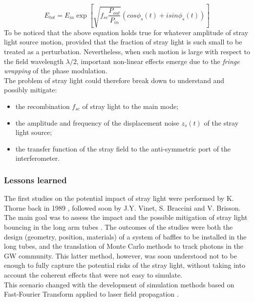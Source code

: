   \begin{equation}
        E_{tot} = E_{in} \exp \left[ \sqrt{f_{sc} \frac{P_{out}}{P_{in}}} \left( cos \phi_s(t) + i sin \phi_s(t) \right) \right]
  \end{equation}
  To be noticed that the above equation holds true for whatever amplitude of stray light source motion, provided that the fraction of stray light is such small to be treated as a perturbation. Nevertheless, when such motion is large with respect to the field wavelength $\lambda/2$, important non-linear effects emerge due to the \textit{fringe wrapping} of the phase modulation.\\
The problem of stray light could therefore break down to understand and possibly mitigate:
\begin{itemize}
    \item the recombination $ f_{sc}$ of stray light to the main mode;
    \item the amplitude and frequency of the displacement noise $z_s(t)$ of the stray light source;
    \item the transfer function of the stray field to the anti-symmetric port of the interferometer.
\end{itemize}
\subsubsection*{Lessons learned}
The first studies on the potential impact of stray light were performed by K. Thorne back in 1989 \cite{Thorne89}, followed soon by J.Y. Vinet, S. Braccini and V. Brisson. The main goal was to assess the impact and the possible mitigation of stray light bouncing in the long arm tubes \cite{Vinet96, Vinet97}. The outcomes of the studies were both the design (geometry, position, materials) of a system of baffles to be installed in the long tubes, and the translation of Monte Carlo methods to track photons in the GW community. This latter method, however, was soon understood not to be enough to fully capture the potential risks of the stray light, without taking into account the coherent effects that were not easy to simulate.\\ This scenario changed with the development of simulation methods based on Fast-Fourier Transform applied to laser field propagation \cite{SIS,DarkF}.
